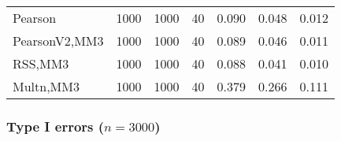 \documentclass[
]{article}
\begin{document}
\begin{table}[H]
{\begin{tabular}[t]{lrrrrrr}
\hspace{1em}Pearson & 1000 & 1000 & 40 & 0.090 & 0.048 & 0.012\\
\hspace{1em}PearsonV2,MM3 & 1000 & 1000 & 40 & 0.089 & 0.046 & 0.011\\
\hspace{1em}RSS,MM3 & 1000 & 1000 & 40 & 0.088 & 0.041 & 0.010\\
\hspace{1em}Multn,MM3 & 1000 & 1000 & 40 & 0.379 & 0.266 & 0.111\\
\bottomrule
\end{tabular}}
\end{table}

\hypertarget{type-i-errors-n3000-1}{%
\subsubsection{\texorpdfstring{Type I errors
(\(n=3000\))}{Type I errors (n=3000)}}\label{type-i-errors-n3000-1}}
\end{document}
